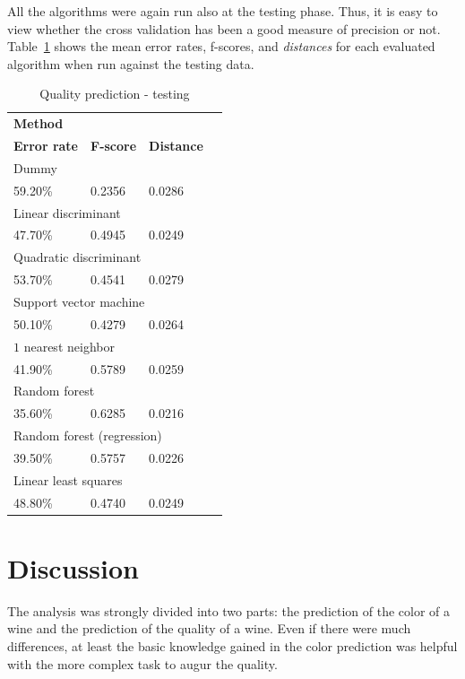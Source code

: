 \documentclass[twoside]{article}
\begin{document}
\begin{multicols}{2}
All the algorithms were again run also at the testing phase. Thus, it is easy to view whether the cross validation has been a good measure of precision or not.
Table~\ref{table:quality_testing} shows the mean error rates, f-scores, and \emph{distances} for each evaluated algorithm when run against the testing data.

\begin{table}[H]
\caption{Quality prediction - testing}
\label{table:quality_testing}
\centering
\begin{tabular}{llll}
\multicolumn{3}{l}{\textbf{Method}} \\
\textbf{Error rate} & \textbf{F-score} & \textbf{Distance} \\
\midrule
\multicolumn{3}{l}{Dummy} \\
59.20\% & 0.2356 & 0.0286 \\
\multicolumn{3}{l}{Linear discriminant} \\
47.70\% & 0.4945 & 0.0249 \\
\multicolumn{3}{l}{Quadratic discriminant} \\
53.70\% & 0.4541 & 0.0279 \\
\multicolumn{3}{l}{Support vector machine} \\
50.10\% & 0.4279 & 0.0264 \\
\multicolumn{3}{l}{$1$ nearest neighbor} \\
41.90\% & 0.5789 & 0.0259 \\
\multicolumn{3}{l}{Random forest} \\
35.60\% & 0.6285 & 0.0216 \\
\multicolumn{3}{l}{Random forest (regression)} \\
39.50\% & 0.5757 & 0.0226 \\
\multicolumn{3}{l}{Linear least squares} \\
48.80\% & 0.4740 & 0.0249 \\
\end{tabular}
\end{table}


\section{Discussion}

The analysis was strongly divided into two parts: the prediction of the color of a wine and the prediction of the 
quality of a wine. Even if there were much differences, at least the basic knowledge gained in the color prediction
was helpful with the more complex task to augur the quality.


\end{multicols}
\end{document}
